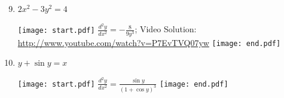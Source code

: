 \documentclass[12pt]{article}
\begin{document}
\begin{enumerate}
\setcounter{enumi}{8}

\item $2x^2-3y^2=4$

\texttt{[image: start.pdf]}
{{$\frac{d^2y}{dx^2}=-\frac{8}{9y^3}$; Video Solution: \href{http://www.youtube.com/watch?v=P7EvTVQ07yw}{http://www.youtube.com/watch?v=P7EvTVQ07yw}}}
\texttt{[image: end.pdf]}


\item $y+\sin{y}=x$

\texttt{[image: start.pdf]}
{{$\frac{d^2y}{dx^2}=\frac{\sin{y}}{(1+\cos{y})^3}$}}
\texttt{[image: end.pdf]}


\end{enumerate}

\end{document}
